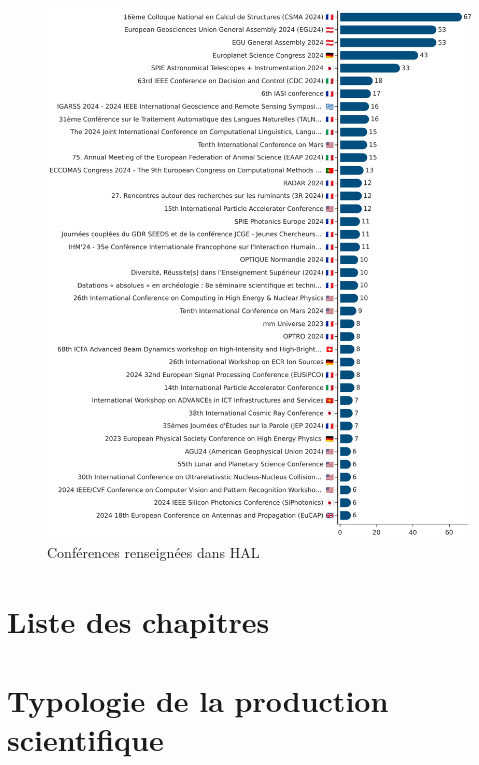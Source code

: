 \documentclass[french, 11pt]{dibiso/biso}
\begin{document}
\begin{figure}[!h]
  \includegraphics[width=\textwidth]{figures/conferences.pdf}
  \centering
  \caption{Conférences renseignées dans HAL}
  \label{fig_conferences}
\end{figure}

{\footnotesize\conferencesinfo}

\pagebreak

\section{Liste des chapitres}

{
  \footnotesize
  
}

{\footnotesize\chaptersinfo}

\pagebreak

\section{Typologie de la production scientifique}
\end{document}
